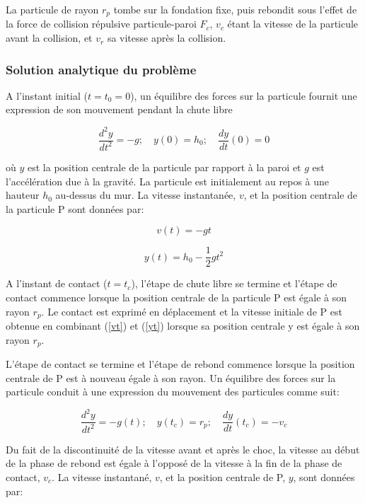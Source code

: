 La particule de rayon $r_p$ tombe sur la fondation fixe, puis rebondit sous l'effet de la force de collision répulsive particule-paroi $F_c$, $v_c$ étant la vitesse de la particule avant la collision, et $v_r$ sa vitesse après la collision.

\subsubsection{Solution analytique du problème}

A l'instant initial ($t = t_0 = 0$), un équilibre des forces sur la particule fournit une expression de son mouvement pendant la chute libre

\begin{equation}
    \frac{d^2 y}{dt^2} = -g; \quad y(0) = h_0; \quad \frac{dy}{dt}(0) = 0
\end{equation}

où $y$ est la position centrale de la particule par rapport à la paroi et $g$ est l'accélération due à la gravité. La particule est initialement au repos à une hauteur $h_0$ au-dessus du mur. La vitesse instantanée, $v$, et la position centrale de la particule P sont données par: 

\begin{equation}
    v(t) = -gt \label{vt}
\end{equation}

\begin{equation}
    y(t) = h_0 - \frac{1}{2}gt^2 \label{yt}
\end{equation}

A l'instant de contact ($t = t_c$), l'étape de chute libre se termine et l'étape de contact commence lorsque la position centrale de la particule P est égale à son rayon $r_p$. Le contact est exprimé en déplacement et la vitesse initiale de P est obtenue en combinant (\ref{vt}) et (\ref{yt}) lorsque sa position centrale y est égale à son rayon $r_p$.

L'étape de contact se termine et l'étape de rebond commence lorsque la position centrale de P est à nouveau égale à son rayon. Un équilibre des forces sur la particule conduit à une expression du mouvement des particules comme suit:

\begin{equation}
    \frac{d^2 y}{dt^2} = -g(t); \quad y(t_c) = r_p; \quad \frac{dy}{dt}(t_c) = - v_c
\end{equation}

Du fait de la discontinuité de la vitesse avant et après le choc, la vitesse au début de la phase de rebond est égale à l'opposé de la vitesse à la fin de la phase de contact, $v_c$. La vitesse instantané, $v$, et la position centrale de P, $y$, sont données par:

